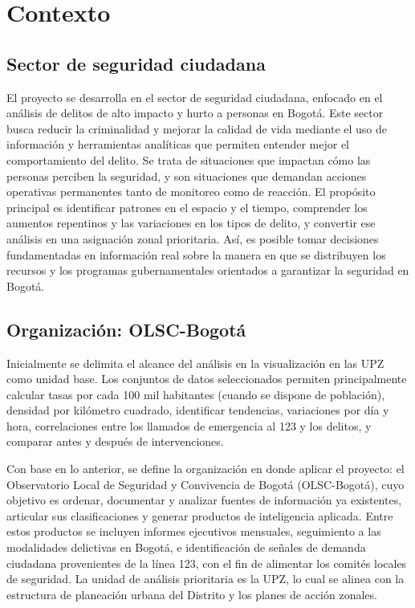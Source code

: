\documentclass[12pt,letterpaper]{article}
\begin{document}
\section{Contexto}

\subsection{Sector de seguridad ciudadana}

El proyecto se desarrolla en el sector de seguridad ciudadana, enfocado en el análisis de delitos de alto impacto y hurto a personas en Bogotá. Este sector busca reducir la criminalidad y mejorar la calidad de vida mediante el uso de información y herramientas analíticas que permiten entender mejor el comportamiento del delito. Se trata de situaciones que impactan cómo las personas perciben la seguridad, y son situaciones que demandan acciones operativas permanentes tanto de monitoreo como de reacción. El propósito principal es identificar patrones en el espacio y el tiempo, comprender los aumentos repentinos y las variaciones en los tipos de delito, y convertir ese análisis en una asignación zonal prioritaria. Así, es posible tomar decisiones fundamentadas en información real sobre la manera en que se distribuyen los recursos y los programas gubernamentales orientados a garantizar la seguridad en Bogotá.

\subsection{Organización: OLSC-Bogotá}

Inicialmente se delimita el alcance del análisis en la visualización en las UPZ como unidad base. Los conjuntos de datos seleccionados permiten principalmente calcular tasas por cada 100 mil habitantes (cuando se dispone de población), densidad por kilómetro cuadrado, identificar tendencias, variaciones por día y hora, correlaciones entre los llamados de emergencia al 123 y los delitos, y comparar antes y después de intervenciones.

Con base en lo anterior, se define la organización en donde aplicar el proyecto: el Observatorio Local de Seguridad y Convivencia de Bogotá (OLSC-Bogotá), cuyo objetivo es ordenar, documentar y analizar fuentes de información ya existentes, articular sus clasificaciones y generar productos de inteligencia aplicada. Entre estos productos se incluyen informes ejecutivos mensuales, seguimiento a las modalidades delictivas en Bogotá, e identificación de señales de demanda ciudadana provenientes de la línea 123, con el fin de alimentar los comités locales de seguridad. La unidad de análisis prioritaria es la UPZ, lo cual se alinea con la estructura de planeación urbana del Distrito y los planes de acción zonales.
\end{document}
